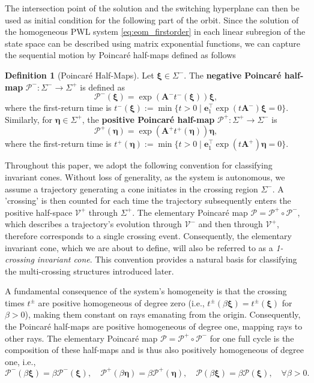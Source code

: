 \documentclass[a4paper,9pt,parskip=half,english]{article}
\theoremstyle{plain}
\theoremstyle{definition}
\newtheorem{definition}{Definition}
\newcommand{\T}{^{\!\top}} %
\newcommand{\veta}{\bm{\eta}}
\newcommand{\vxi}{\bm{\xi}}
\newcommand{\ve}{\mathbf e}
\newcommand{\vA}{\mathbf A}
\newcommand{\cP}{\mathcal{P}}
\newcommand{\cVplus}{\mathcal{V}^+}
\newcommand{\cVminus}{\mathcal{V}^-}
\begin{document}
The intersection point of the solution and the switching hyperplane can then be used as initial condition for the following part of the orbit. Since the solution of the homogeneous PWL system \eqref{eq:eom_firstorder} in each linear subregion of the state space can be described using matrix exponential functions, we can capture the sequential motion by Poincaré half-maps defined as follows
\begin{definition}[Poincaré Half-Maps]
	Let $\vxi \in \Sigma^-$. The \textbf{negative Poincaré half-map} $\mathcal{P}^-: \Sigma^- \to \Sigma^+$ is defined as
	$$\mathcal{P}^-(\vxi) = \exp(\vA^- t^-(\vxi)) \vxi,$$
	where the first-return time is $t^-(\vxi) := \min \{ t> 0 \mid \ve_1\T \exp(t \vA^-) \vxi = 0 \}$. Similarly, for $\veta \in \Sigma^+$, the \textbf{positive Poincaré half-map} $\mathcal{P}^+: \Sigma^+ \to \Sigma^-$ is
	$$\mathcal{P}^+(\veta) = \exp(\vA^+ t^+(\veta)) \veta,$$
	where the first-return time is $t^+(\veta) := \min \{ t> 0 \mid \ve_1\T \exp(t \vA^+) \veta = 0 \}$.
\end{definition}

Throughout this paper, we adopt the following convention for classifying invariant cones. Without loss of generality, as the system is autonomous, we assume a trajectory generating a cone initiates in the crossing region $\Sigma^-$. A 'crossing' is then counted for each time the trajectory subsequently enters the positive half-space $\cVplus$ through $\Sigma^+$. The elementary Poincaré map $\mathcal{P} = \mathcal{P}^+ \circ \mathcal{P}^-$, which describes a trajectory's evolution through $\cVminus$ and then through $\cVplus$, therefore corresponds to a single crossing event. Consequently, the elementary invariant cone, which we are about to define, will also be referred to as a \textit{1-crossing invariant cone}. This convention provides a natural basis for classifying the multi-crossing structures introduced later.

A fundamental consequence of the system's homogeneity is that the crossing times $t^\pm$ are positive homogeneous of degree zero (i.e., $t^\pm(\beta\vxi) = t^\pm(\vxi)$ for $\beta>0$), making them constant on rays emanating from the origin. Consequently, the Poincaré half-maps are positive homogeneous of degree one, mapping rays to other rays. The elementary Poincaré map $\cP = \cP^+ \circ \cP^-$ for one full cycle is the composition of these half-maps and is thus also positively homogeneous of degree one, i.e., 
\begin{equation}\label{eq_homog_prop_poincare}
	\mathcal{P}^- (\beta \bm{\xi}) = \beta \mathcal{P}^- ( \bm{\xi}), \quad \mathcal{P}^+ (\beta \bm{\eta}) = \beta \mathcal{P}^+ ( \bm{\eta}), \quad 
	\mathcal{P} (\beta \bm{\xi}) = \beta \mathcal{P} ( \bm{\xi}), \quad \forall \beta >0.
\end{equation}
\end{document}

